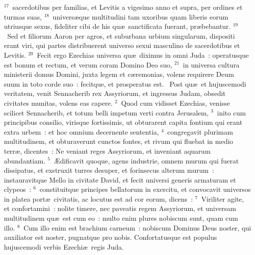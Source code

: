 ${}^{17}$~sacerdotibus per familias, et Levitis a vigesimo anno et supra, per ordines et turmas suas,
${}^{18}$~univers\ae que multitudini tam uxoribus quam liberis eorum utriusque sexus, fideliter cibi de his qu\ae\ sanctificata fuerant, pr\ae bebantur.
${}^{19}$~Sed et filiorum Aaron per agros, et suburbana urbium singularum, dispositi erant viri, qui partes distribuerent universo sexui masculino de sacerdotibus et Levitis.
${}^{20}$~Fecit ergo Ezechias universa qu\ae\ diximus in omni Juda~: operatusque est bonum et rectum, et verum coram Domino Deo suo,
${}^{21}$~in universa cultura ministerii domus Domini, juxta legem et c\ae remonias, volens requirere Deum suum in toto corde suo~: fecitque, et prosperatus est.
~\lettrine[lines=10,image=true,loversize=0.05,lraise=-0.03]{P}{}ost qu\ae\ et hujuscemodi veritatem, venit Sennacherib rex Assyriorum, et ingressus Judam, obsedit civitates munitas, volens eas capere.
${}^{2}$~Quod cum vidisset Ezechias, venisse scilicet Sennacherib, et totum belli impetum verti contra Jerusalem,
${}^{3}$~inito cum principibus consilio, virisque fortissimis, ut obturarent capita fontium qui erant extra urbem~: et hoc omnium decernente sententia,
${}^{4}$~congregavit plurimam multitudinem, et obturaverunt cunctos fontes, et rivum qui fluebat in medio terr\ae , dicentes~: Ne veniant reges Assyriorum, et inveniant aquarum abundantiam.
${}^{5}$~\AE dificavit quoque, agens industrie, omnem murum qui fuerat dissipatus, et exstruxit turres desuper, et forinsecus alterum murum~: instauravitque Mello in civitate David, et fecit universi generis armaturam et clypeos~:
${}^{6}$~constituitque principes bellatorum in exercitu, et convocavit universos in platea port\ae\ civitatis, ac locutus est ad cor eorum, dicens~:
${}^{7}$~Viriliter agite, et confortamini~: nolite timere, nec paveatis regem Assyriorum, et universam multitudinem qu\ae\ est cum eo~: multo enim plures nobiscum sunt, quam cum illo.
${}^{8}$~Cum illo enim est brachium carneum~: nobiscum Dominus Deus noster, qui auxiliator est noster, pugnatque pro nobis. Confortatusque est populus hujuscemodi verbis Ezechi\ae\ regis Juda.


